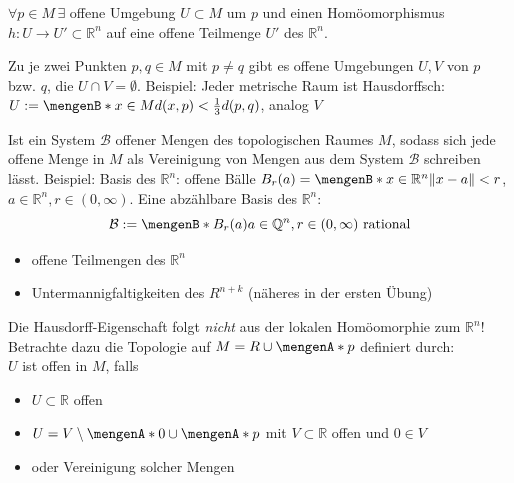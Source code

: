 \begin{description}
	\item{}  $\forall p \in M \, \exists$ offene Umgebung $U \subset M$ um $p$ und einen Homöomorphismus $h : U \to U' \subset \mathds{R}^n$  auf 
	eine offene Teilmenge $U'$ des $\mathds{R}^n$. 
	\item{}  Zu je zwei Punkten $p, q \in M$ mit $p \not= q$ gibt es offene Umgebungen $U,V$ von $p$ bzw. $q$, die $U \cap V = \emptyset$. Beispiel: Jeder
	metrische Raum ist Hausdorffsch: $U := \set[x \in M]{d(x,p)< \frac{1}{3} d(p,q) } $, analog $V$ \\
	\item{}  Ist ein System $\mathcal{B}$ offener Mengen des topologischen Raumes $M$, sodass sich jede offene Menge in $M$ als 
	Vereinigung von Mengen aus 
	dem System $\mathcal{B}$ schreiben lässt. \newline Beispiel: Basis des $\mathds{R}^n$: offene Bälle 
	$B_r(a) = \set[x \in \mathds{R}^n]{\norm{x-a} < r } $, $a \in \mathds{R}^n, r \in (0, \infty)$. Eine abzählbare Basis des $\mathds{R}^n$: 
	\[
		\mathcal{B} := \set[B_r(a)]{a \in \mathds{Q}^n, r \in (0,\infty) \text{ rational}} 
	\]
\end{description}


\begin{itemize}
	\item offene Teilmengen des $\mathds{R}^n$
	\item Untermannigfaltigkeiten des $R^{n+k}$ \hfill {\color{light_gray}(näheres in der ersten Übung)}
\end{itemize}

Die Hausdorff-Eigenschaft folgt \emph{nicht} aus der lokalen Homöomorphie zum $\mathds{R}^n$! Betrachte dazu die Topologie auf $M = R \cup \set{p} $ definiert durch: 
\smallskip\\ $U$ ist offen in $M$, falls\\
\begin{minipage}{0.55\textwidth}
	\begin{itemize}
		\item $U \subset \mathds{R}$ offen
		\item $U = V \setminus \set{0} \cup \set{p}$ mit $V \subset \mathds{R}$ offen und $0 \in V$
		\item oder Vereinigung solcher Mengen
	\end{itemize}
\end{minipage} \quad 
\begin{minipage}{0.35\textwidth}
	\captionsetup{type=figure, skip=1pt}
\end{minipage}

